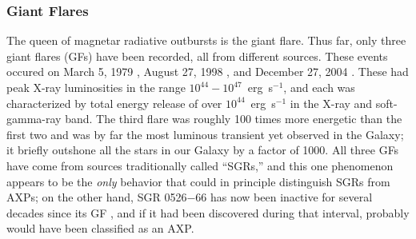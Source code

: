





\subsubsection{Giant Flares}
\label{sec:giantflares}

The queen of magnetar radiative outbursts is the giant flare.
Thus far, only three giant flares (GFs) have been recorded, all from
different sources.  These events occured on March 5, 1979 \citep[SGR
0526$-$66; ][]{ekl+80}, August 27, 1998 \citep[SGR 1900+14][]{hcm+99},
and December 27, 2004 \citep[SGR 1806$-$20; ][]{hbs+05,mgv+05,bzh+07}.  These had peak
X-ray luminosities in the range $10^{44} - 10^{47}$~erg~s$^{-1}$, and each
was characterized by total energy release of over $10^{44}$~erg~s$^{-1}$
in the X-ray and soft-gamma-ray band.  The third flare was roughly 100
times more energetic than the first two and was by far the most luminous
transient yet observed in the Galaxy; it briefly outshone all the stars
in our Galaxy by a factor of 1000.  All three GFs have come from sources
traditionally called ``SGRs,'' and this one phenomenon appears to be the
{\it only} behavior that could in principle distinguish SGRs from AXPs;
on the other hand, SGR 0526$-$66 has now been inactive for several decades
since its GF \citep{kkm+03,tem+09}, and if it had been discovered during
that interval, probably would have been classified as an AXP.

